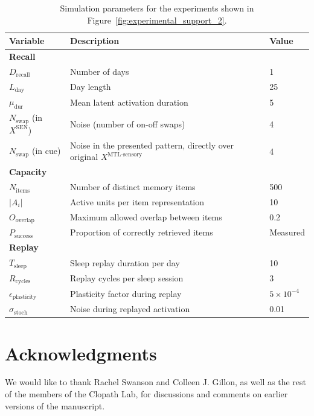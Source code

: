 \documentclass{article}
\begin{document}
\begin{table}[ht]
\centering
\caption{Simulation parameters for the experiments shown in Figure~\ref{fig:experimental_support_2}.}
\label{tab:fig6_parameters}
\begin{tabular}{lll}
\toprule
\textbf{Variable} & \textbf{Description} & \textbf{Value} \\
\midrule

\multicolumn{3}{l}{\textbf{Recall}} \\
\midrule
$D_{\text{recall}}$ & Number of days & 1\\
$L_{\text{day}}$ & Day length & 25 \\
$\mu_{\text{dur}}$ & Mean latent activation duration & 5 \\
$N_\textrm{swap}$ (in $X^\textrm{SEN}$) & Noise (number of on-off swaps) & 4\\
$N_\textrm{swap}$ (in cue) & Noise in the presented pattern, directly over original $X^\textrm{MTL-sensory}$& 4\\

\midrule
\multicolumn{3}{l}{\textbf{Capacity}} \\
\midrule
$N_{\text{items}}$ & Number of distinct memory items & 500 \\
$|A_i|$ & Active units per item representation & 10 \\
$O_{\text{overlap}}$ & Maximum allowed overlap between items & 0.2 \\
$P_{\text{success}}$ & Proportion of correctly retrieved items & Measured \\

\midrule
\multicolumn{3}{l}{\textbf{Replay}} \\
\midrule
$T_{\text{sleep}}$ & Sleep replay duration per day & 10 \\
$R_{\text{cycles}}$ & Replay cycles per sleep session & 3 \\
$\epsilon_{\text{plasticity}}$ & Plasticity factor during replay & $5 \times 10^{-4}$ \\
$\sigma_{\text{stoch}}$ & Noise during replayed activation & 0.01 \\

\bottomrule
\end{tabular}
\end{table}
\section*{Acknowledgments}
We would like to thank Rachel Swanson and Colleen J. Gillon, as well as the rest of the members of the Clopath Lab, for discussions and  comments on earlier versions of the manuscript.
\end{document}
